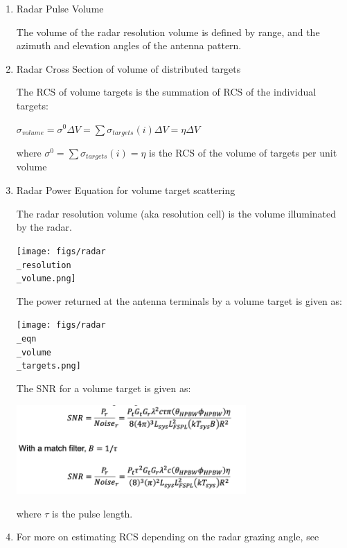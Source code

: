 \documentclass[10pt]{article}
\begin{document}
\begin{enumerate}





\item Radar Pulse Volume

The volume of the radar resolution volume is defined by range, and the
azimuth and elevation angles of the antenna pattern.




\item Radar Cross Section of volume of distributed targets

The RCS of volume targets is the summation of RCS of the individual targets:

$\sigma_{volume} = \sigma^0 \Delta V = \sum \sigma_{targets}(i) \Delta V = \eta \Delta V$

where $\sigma^0 = \sum \sigma_{targets}(i) = \eta$ is the RCS of the volume of targets per unit volume


\item Radar Power Equation for volume target scattering

The radar resolution volume (aka resolution cell) is the volume
illuminated by the radar.

\texttt{[image: figs/radar\\\_resolution\\\_volume.png]}

The power returned at the antenna terminals by a volume target is given as:

\texttt{[image: figs/radar\\\_eqn\\\_volume\\\_targets.png]}

The SNR for a volume target is given as:

\includegraphics[width=0.69\textwidth]{figs/SNRVolume.png}

where $\tau$ is the pulse length.




\item For more on estimating RCS depending on the radar grazing angle, see 


\end{enumerate}
\end{document}
